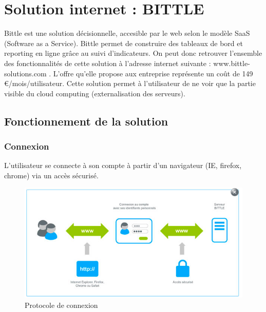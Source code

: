\section{Solution internet : BITTLE}
Bittle est une solution décisionnelle, accesible par le web selon le modèle SaaS (Software as a Service). Bittle permet de construire des tableaux de bord et reporting en ligne grâce au suivi d'indicateurs. On peut donc retrouver l'ensemble des fonctionnalités de cette solution à l'adresse internet suivante :  www.bittle-solutions.com . L'offre qu'elle propose aux entreprise représente un coût de 149 €/mois/utilisateur.
Cette solution permet à l'utilisateur de ne voir que la partie visible du cloud computing (externalisation des serveurs).
\subsection{Fonctionnement de la solution}
\subsubsection{Connexion}
L'utilisateur se connecte à son compte à partir d'un
navigateur (IE, firefox, chrome) via un accès sécurisé.
\begin{figure}[H]
\begin{center}
  \includegraphics[scale= 0.6]{connexion.png}
  \caption{Protocole de connexion}
\end{center}  
\end{figure}
